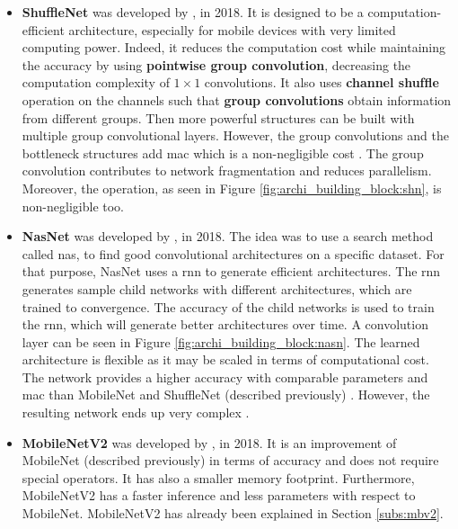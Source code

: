 \begin{itemize}
    \item \textbf{ShuffleNet}  was developed by \textcite{zhang_shufflenet_2018}, in 2018. It is designed to be a computation-efficient architecture, especially for mobile devices with very limited computing power. Indeed, it reduces the computation cost while maintaining the accuracy by using \textbf{pointwise group convolution}, decreasing the computation complexity of $1 \times 1$ convolutions. It also uses \textbf{channel shufﬂe} operation on the channels such that \textbf{group convolutions} obtain information from different groups. Then more powerful structures can be built with multiple group convolutional layers. However, the group convolutions and the bottleneck structures add \acrfull{mac} which is a non-negligible cost \cite{ma_shufflenet_2018}. The group convolution contributes to network fragmentation and reduces parallelism. Moreover, the  operation, as seen in Figure \ref{fig:archi_building_block:shn}, is non-negligible too.
    \item \textbf{NasNet} was developed by \textcite{zoph_learning_2018}, in 2018. The idea was to use a search method called \acrfull{nas}, to find good convolutional architectures on a specific dataset. For that purpose, NasNet uses a \acrfull{rnn} to generate efficient architectures. The \acrshort{rnn} generates sample child networks with different architectures, which are trained to convergence. The accuracy of the child networks is used to train the \acrshort{rnn}, which will generate better architectures over time. A convolution layer can be seen in Figure \ref{fig:archi_building_block:nasn}. The learned architecture is flexible as it may be scaled in terms of computational cost. The network provides a higher accuracy with comparable parameters and \acrshort{mac} than MobileNet and ShuffleNet (described previously) \cite{zoph_learning_2018}. However, the resulting network ends up very complex \cite{sandler_mobilenetv2_2018}.
    \item \textbf{MobileNetV2} was developed by \textcite{sandler_mobilenetv2_2018}, in 2018. It is an improvement of MobileNet (described previously) in terms of accuracy and does not require special operators. It has also a smaller memory footprint. Furthermore, MobileNetV2 has a faster inference and less parameters with respect to MobileNet. MobileNetV2 has already been explained in Section \ref{subs:mbv2}.
\end{itemize}
%
